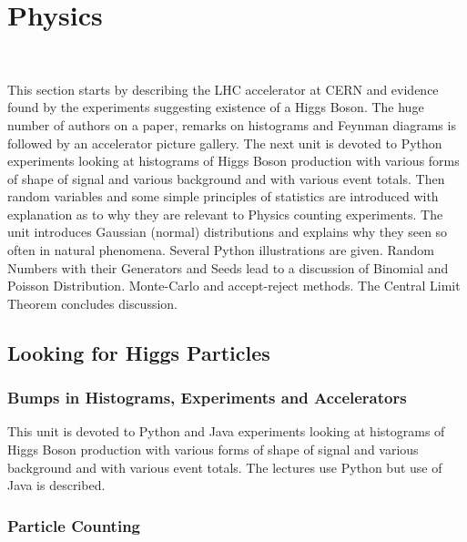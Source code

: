

\chapter{Physics}
\label{c:physics}


\FILENAME\

This section starts by describing the LHC accelerator at CERN and
evidence found by the experiments suggesting existence of a Higgs Boson.
The huge number of authors on a paper, remarks on histograms and Feynman
diagrams is followed by an accelerator picture gallery. The next unit is
devoted to Python experiments looking at histograms of Higgs Boson
production with various forms of shape of signal and various background
and with various event totals. Then random variables and some simple
principles of statistics are introduced with explanation as to why they
are relevant to Physics counting experiments. The unit introduces
Gaussian (normal) distributions and explains why they seen so often in
natural phenomena. Several Python illustrations are given. Random
Numbers with their Generators and Seeds lead to a discussion of Binomial
and Poisson Distribution. Monte-Carlo and accept-reject methods. The
Central Limit Theorem concludes discussion.

\section{Looking for Higgs Particles}

\subsection{Bumps in Histograms,  Experiments and Accelerators}

This unit is devoted to Python and Java experiments looking at
histograms of Higgs Boson production with various forms of shape of
signal and various background and with various event totals. The
lectures use Python but use of Java is described.




\subsection{Particle Counting}

